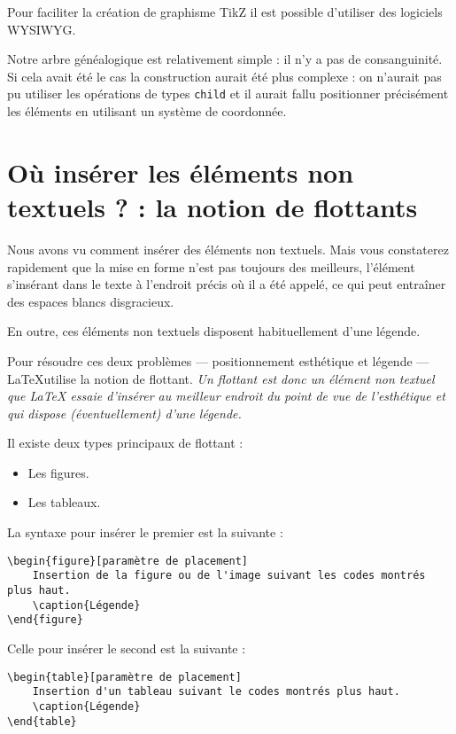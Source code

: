 Pour faciliter la création de graphisme TikZ il est possible d'utiliser des logiciels WYSIWYG.

Notre arbre généalogique est relativement simple : il n'y a pas de consanguinité. Si cela avait été le cas la construction aurait été plus complexe : on n'aurait pas pu utiliser les opérations de types \verb|child| et il aurait fallu positionner précisément les éléments en utilisant un système de coordonnée.



\section[La notion de flottants]{Où insérer les éléments non textuels ? : la notion de flottants}
\label{legende}
Nous avons vu comment insérer des éléments non textuels. Mais vous constaterez rapidement que la mise en forme n'est pas toujours des meilleurs, l'élément s'insérant dans le texte à l'endroit précis où il a été appelé, ce qui peut entraîner des espaces blancs disgracieux.

En outre, ces éléments non textuels disposent habituellement d'une légende.

Pour résoudre ces deux problèmes --- positionnement esthétique et légende --- \LaTeX utilise la notion de flottant. \emph{Un flottant est donc un élément non textuel que LaTeX essaie d'insérer au meilleur endroit du point de vue de l'esthétique et qui dispose (éventuellement) d'une légende.}

Il existe deux types principaux de flottant :
\begin{itemize}
	\item Les figures.
	\item Les tableaux.
\end{itemize}

La syntaxe pour insérer le premier est la suivante :

\begin{verbatim}
\begin{figure}[paramètre de placement]
	Insertion de la figure ou de l'image suivant les codes montrés plus haut.
	\caption{Légende}
\end{figure} 
\end{verbatim}

Celle pour insérer le second est la suivante :
\begin{verbatim}
\begin{table}[paramètre de placement]
	Insertion d'un tableau suivant le codes montrés plus haut.
	\caption{Légende}
\end{table} 
\end{verbatim}


